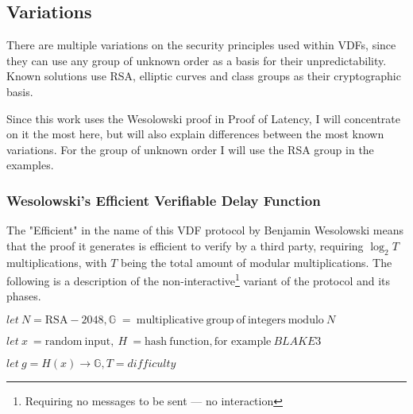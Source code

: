 \subsection{Variations}
There are multiple variations on the security principles used within VDFs, since they can use any group of unknown order as a basis for their unpredictability. Known solutions use RSA, elliptic curves and class groups as their cryptographic basis.

Since this work uses the Wesolowski proof in Proof of Latency, I will concentrate on it the most here, but will also explain differences between the most known variations. For the group of unknown order I will use the RSA group in the examples.

\subsubsection{Wesolowski's Efficient Verifiable Delay Function}
The "Efficient" in the name of this VDF protocol by Benjamin Wesolowski means that the proof it generates is efficient to verify by a third party, requiring \( \log _{2} T \) multiplications, with \( T \) being the total amount of modular multiplications. The following is a description of the non-interactive\footnote{Requiring no messages to be sent --- no interaction} variant of the protocol and its phases.

\( let \: N = \mathrm{RSA-2048}, \mathbb{G} \; = \: \mathrm{multiplicative} \: \mathrm{group} \: \mathrm{of} \: \mathrm{integers} \: \mathrm{modulo} \: N \)

\( let \: x \: = \mathrm{random} \: \mathrm{input},  \: H \: = \mathrm{hash} \: \mathrm{function}, \text{for example} \: BLAKE3 \)

\( let \: g = H(x) \to \mathbb{G}, T = difficulty \)

